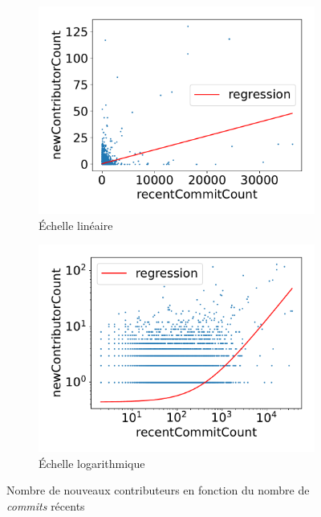 \documentclass[dvipsnames,runningheads]{llncs}
\begin{document}
    \begin{figure}[ht]
        \centering
        \begin{subfigure}[t]{0.5\textwidth}
            \includegraphics[width=\textwidth]{../experiment/data_analysis/recentCommitCountRegression_linearScale}
            \caption{Échelle linéaire}
        \end{subfigure}%
        \begin{subfigure}[t]{0.5\textwidth}
            \includegraphics[width=\textwidth]{../experiment/data_analysis/recentCommitCountRegression_logScale}
            \caption{Échelle logarithmique}
        \end{subfigure}

        \caption{Nombre de nouveaux contributeurs en fonction du nombre de \emph{commits} récents}
        \label{fig:commitCount}
    \end{figure}
\end{document}
